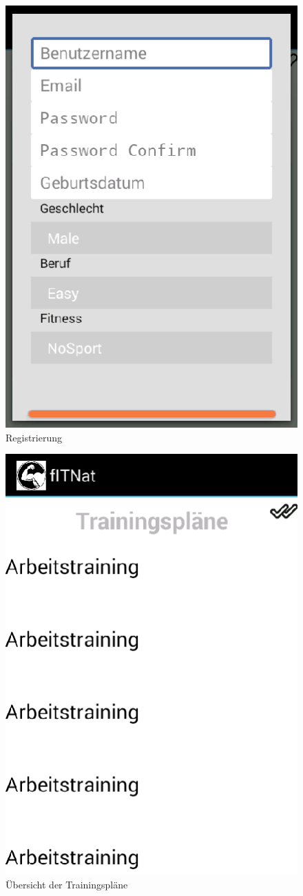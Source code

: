 \begin{figure}[!h]
\centering
\includegraphics[width=0.5\linewidth]{content/images/App/SignUp}
\caption{Registrierung}
\label{pic:natAppRegistrierung}
\end{figure}
\begin{figure}[!h]
\centering
\includegraphics[width=0.5\linewidth]{content/images/App/Trainingsplan}
\caption{Übersicht der Trainingspläne}
\label{pic:natAppTrainingspläne}
\end{figure}

